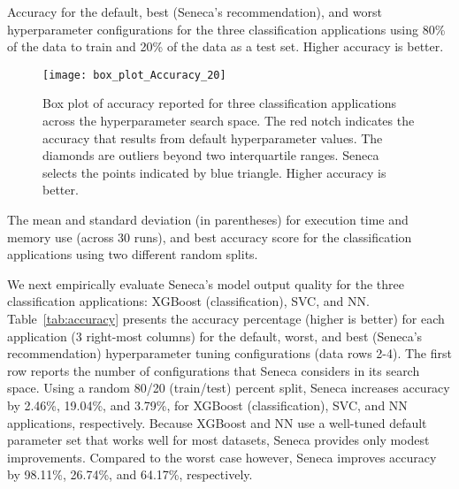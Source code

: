 \begin{table}
\centering

\caption{Accuracy for the 
default, best (Seneca's recommendation), and worst hyperparameter configurations for 
the three classification applications using 80\% of the data to train and 20\%
of the data as a test set. Higher accuracy is better.
\label{tab:accuracy}}
\vspace{-0.1in}
\end{table}

\begin{figure}[t] \centering 
\vspace{-0.3in}
\texttt{[image: box\_plot\_Accuracy\_20]}
\vspace{-0.4in}
\caption{Box plot of accuracy reported for three classification applications across 
the hyperparameter search space. The red notch indicates the accuracy that results
from default hyperparameter values.
The diamonds are outliers beyond two interquartile ranges. 
Seneca selects the points indicated by blue triangle. 
Higher accuracy is better. 
\label{fig:box_plot_accuracy}}
\vspace{-0.1in}
\end{figure}

\begin{table}[t]
\centering
\scriptsize

\caption{The mean and standard deviation (in parentheses) for execution time and memory use 
(across 30 runs),
and best accuracy score for the classification applications using two different random splits. 
\label{tab:exec_memory}}
\vspace{-0.1in}
\end{table}


We next empirically evaluate Seneca's model output quality for the three
classification applications: XGBoost (classification), SVC, and NN.
Table~\ref{tab:accuracy} presents the accuracy percentage (higher is better)
for each application (3 right-most columns)
for the default, worst, and best (Seneca's recommendation) hyperparameter tuning
configurations (data rows 2-4).
The first row 
reports the number of configurations that Seneca considers in its search space.
Using a random 80/20 (train/test) percent split,
Seneca increases accuracy by 2.46\%, 19.04\%, and 3.79\%, for XGBoost
(classification), SVC, and NN applications, respectively.  
Because XGBoost and NN use a well-tuned default parameter set that works well for most datasets, Seneca provides only modest improvements.
Compared to the worst case however, Seneca improves accuracy by 98.11\%, 26.74\%, and 64.17\%,
respectively.  

